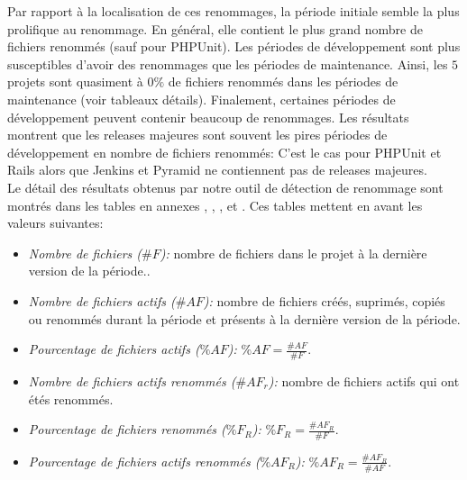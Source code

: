 Par rapport à la localisation de ces renommages, la période initiale semble la plus prolifique au renommage. En général, elle contient le plus grand nombre de fichiers renommés (sauf pour PHPUnit). Les périodes de développement sont plus susceptibles d'avoir des renommages que les périodes de maintenance. Ainsi, les $5$ projets sont quasiment à $0\%$ de fichiers renommés dans les périodes de maintenance (voir tableaux détails). Finalement, certaines périodes de développement peuvent contenir beaucoup de renommages. Les résultats montrent que les releases majeures sont souvent les pires périodes de développement en nombre de fichiers renommés: C'est le cas pour PHPUnit et Rails alors que Jenkins et Pyramid ne contiennent pas de releases majeures.\\
\newpage
Le détail des résultats obtenus par notre outil de détection de renommage sont montrés dans les tables en annexes , , ,  et . Ces tables mettent en avant les valeurs suivantes:\\

\begin{itemize}
\item \emph{Nombre de fichiers ($\#F$):} nombre de fichiers dans le projet à la dernière version de la période..
\item \emph{Nombre de fichiers actifs ($\#AF$):} nombre de fichiers créés, suprimés, copiés ou renommés durant la période et présents à la dernière version de la période.
\item \emph{Pourcentage de fichiers actifs ($\%AF$):} $\%AF = \frac{\#AF}{\#F}$.
\item \emph{Nombre de fichiers actifs renommés ($\#AF_{r}$):} nombre de fichiers actifs qui ont étés renommés.
\item \emph{Pourcentage de fichiers renommés ($\%F_{R}$):} $\%F_{R} = \frac{\#AF_{R}}{\#F}$.
\item \emph{Pourcentage de fichiers actifs renommés ($\%AF_{R}$):} $\%AF_{R} = \frac{\#AF_{R}}{\#AF}$.
\end{itemize}

